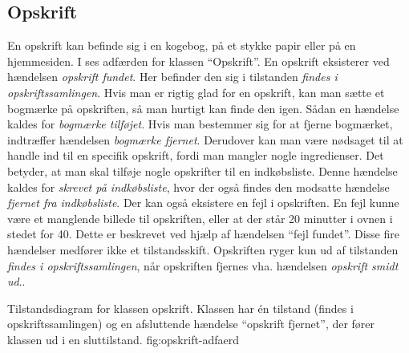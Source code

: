 \subsection{Opskrift}
En opskrift kan befinde sig i en kogebog, på et stykke papir eller på en hjemmesiden. I  ses adfærden for klassen ``Opskrift''. En opskrift eksisterer ved hændelsen \textit{opskrift fundet}. Her befinder den sig i tilstanden \textit{findes i opskriftssamlingen}. Hvis man er rigtig glad for en opskrift, kan man sætte et bogmærke på opskriften, så man hurtigt kan finde den igen. Sådan en hændelse kaldes for \textit{bogmærke tilføjet}. Hvis man bestemmer sig for at fjerne bogmærket, indtræffer hændelsen \textit{bogmærke fjernet}. Derudover kan man være nødsaget til at handle ind til en specifik opskrift, fordi man mangler nogle ingredienser. Det betyder, at man skal tilføje nogle opskrifter til en indkøbsliste. Denne hændelse kaldes for \textit{skrevet på indkøbsliste}, hvor der også findes den modsatte hændelse \textit{fjernet fra indkøbsliste}. Der kan også eksistere en fejl i opskriften. En fejl kunne være et manglende billede til opskriften, eller at der står 20 minutter i ovnen i stedet for 40. Dette er beskrevet ved hjælp af hændelsen ``fejl fundet''. Disse fire hændelser medfører ikke et tilstandsskift. Opskriften ryger kun ud af tilstanden \textit{findes i opskriftssamlingen}, når opskriften fjernes vha. hændelsen \textit{opskrift smidt ud}..

  {Tilstandsdiagram for klassen opskrift. Klassen har én tilstand (findes i opskriftssamlingen) og en afsluttende hændelse ``opskrift fjernet'', der fører klassen ud i en sluttilstand.}
  {fig:opskrift-adfaerd}
